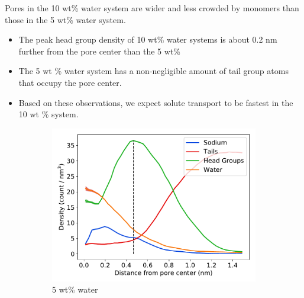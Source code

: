 \documentclass{article}
\begin{document}
  \noindent Pores in the 10 wt\% water system are wider and less crowded by monomers than
  those in the 5 wt\% water system.
  \begin{itemize}
    \item The peak head group density of 10 wt\% water systems is about 0.2 nm
    further from the pore center than the 5 wt\%
    \item The 5 wt \% water system has a non-negligible amount of tail group atoms
    that occupy the pore center.
    \item Based on these observations, we expect solute transport to be fastest 
    in the 10 wt \% system.
  \end{itemize}
  
  \begin{figure}[!htb]
  \centering
  \begin{subfigure}{0.415\textwidth}
  \includegraphics[width=\textwidth]{component_density_5wt.pdf}
  \caption{5 wt\% water}\label{fig:component_density_5wt}
  \end{subfigure}
  \begin{subfigure}{0.15\textwidth}
  \vspace{-0.5cm}

\end{subfigure}
\end{figure}
\end{document}
